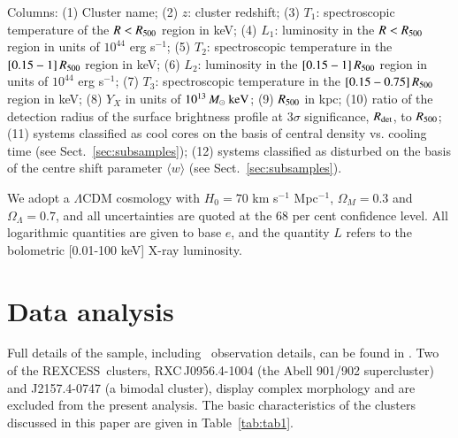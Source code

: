 \documentclass[oldversion]{aa}
\newcommand{\rexcess}{{\gwpfont REXCESS}}
\begin{document}
{\begin{table}
\begin{center}
\begin{tabular}{l l l r l r l r r r c c}
\\
\hline
\end{tabular}
\end{center}

Columns: (1) Cluster name; (2) $z$: cluster redshift; (3) $T_1$: spectroscopic  
temperature of the $R < R_{500}$ region in keV; (4) $L_1$: luminosity in the $R < R_{500}$ region in units of $10^{44}$ erg s$^{-1}$; (5) $T_2$: spectroscopic temperature in the $[0.15-1]\,R_{500}$ region in keV; (6) $L_2$: luminosity in the $[0.15-1]\, R_{500}$ region in units of $10^{44}$ erg s$^{-1}$; (7) $T_3$: spectroscopic temperature in the $[0.15-0.75]\,R_{500}$ region in keV; (8) $Y_X$ in units of $10^{13}\, M_\odot\ {\rm keV}$; (9) $R_{500}$ in kpc; (10) ratio of the
    detection radius of the surface brightness profile at $3\sigma$
    significance, $R_{\rm det}$, to $R_{500}$; (11) systems classified as cool cores on the basis of central density vs. cooling time (see Sect.~\ref{sec:subsamples}); (12) systems classified as disturbed on the basis of the centre shift parameter $\langle w \rangle$ (see Sect.~\ref{sec:subsamples}).
    \end{table}

We adopt a $\Lambda$CDM cosmology with $H_0=70$
km s$^{-1}$ Mpc$^{-1}$, $\Omega_M=0.3$ and $\Omega_\Lambda=0.7$, and all uncertainties are quoted at the 68 per cent confidence level. All logarithmic quantities are given to base $e$, and the quantity $L$ refers to the bolometric [0.01-100 keV] X-ray luminosity.


\section{Data analysis}


Full details of the sample,
including \xmm\ observation details, can be found in
\citet{boehringer07}. 
Two of the \rexcess\ clusters, RXC\,J0956.4-1004 (the Abell 901/902
supercluster) and J2157.4-0747 (a bimodal cluster),
display complex morphology and are excluded from the present
analysis. The basic characteristics of the clusters discussed in this
paper are given in Table~\ref{tab:tab1}.




}
\end{document}
